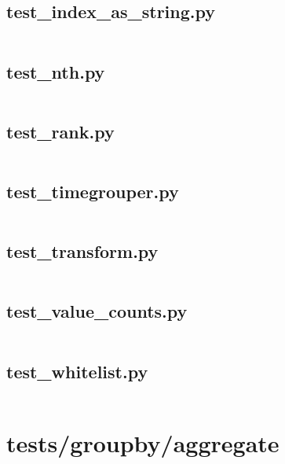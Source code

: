 \documentclass{article}
\begin{document}
\subsection{test\_index\_as\_string.py}
\inputminted{python}{/home/dufferzafar/dev/@clones/pandas/pandas/tests/groupby/test_index_as_string.py}
\newpage

\subsection{test\_nth.py}
\inputminted{python}{/home/dufferzafar/dev/@clones/pandas/pandas/tests/groupby/test_nth.py}
\newpage

\subsection{test\_rank.py}
\inputminted{python}{/home/dufferzafar/dev/@clones/pandas/pandas/tests/groupby/test_rank.py}
\newpage

\subsection{test\_timegrouper.py}
\inputminted{python}{/home/dufferzafar/dev/@clones/pandas/pandas/tests/groupby/test_timegrouper.py}
\newpage

\subsection{test\_transform.py}
\inputminted{python}{/home/dufferzafar/dev/@clones/pandas/pandas/tests/groupby/test_transform.py}
\newpage

\subsection{test\_value\_counts.py}
\inputminted{python}{/home/dufferzafar/dev/@clones/pandas/pandas/tests/groupby/test_value_counts.py}
\newpage

\subsection{test\_whitelist.py}
\inputminted{python}{/home/dufferzafar/dev/@clones/pandas/pandas/tests/groupby/test_whitelist.py}
\newpage

\section{tests/groupby/aggregate}
\end{document}
